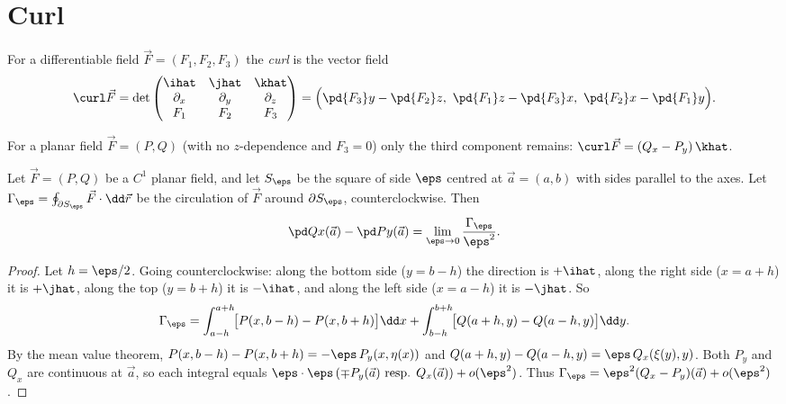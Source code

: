 \section{Curl}

\begin{definition}[Curl]
For a differentiable field $\vec F=(F_1,F_2,F_3)$ the \emph{curl} is the vector field
\[
\curl\vec F=\det\begin{pmatrix}\ihat&\jhat&\khat\\\partial_x&\partial_y&\partial_z\\F_1&F_2&F_3\end{pmatrix}
=\Bigl(\pd{F_3}y-\pd{F_2}z,\ \pd{F_1}z-\pd{F_3}x,\ \pd{F_2}x-\pd{F_1}y\Bigr).
\]
\end{definition}

For a planar field $\vec F=(P,Q)$ (with no $z$-dependence and $F_3=0$) only the third component remains: $\curl\vec F=(Q_x-P_y)\,\khat$.

\begin{theorem}[Curl = circulation per unit area]\label{thm:curlmeaning}
Let $\vec F=(P,Q)$ be a $C^1$ planar field, and let $S_\eps$ be the square of side $\eps$ centred at $\vec a=(a,b)$ with sides parallel to the axes. Let $\Gamma_\eps=\oint_{\partial S_\eps}\vec F\cdot\dd\vec r$ be the circulation of $\vec F$ around $\partial S_\eps$, counterclockwise. Then
\[
\pd Qx(\vec a)-\pd Py(\vec a)=\lim_{\eps\to0}\frac{\Gamma_\eps}{\eps^2}.
\]
\end{theorem}

\begin{proof}
Let $h=\eps/2$. Going counterclockwise: along the bottom side ($y=b-h$) the direction is $+\ihat$, along the right side ($x=a+h$) it is $+\jhat$, along the top ($y=b+h$) it is $-\ihat$, and along the left side ($x=a-h$) it is $-\jhat$. So
\[
\Gamma_\eps=\int_{a-h}^{a+h}\!\bigl[P(x,b-h)-P(x,b+h)\bigr]\dd x+\int_{b-h}^{b+h}\!\bigl[Q(a+h,y)-Q(a-h,y)\bigr]\dd y .
\]
By the mean value theorem, $P(x,b-h)-P(x,b+h)=-\eps\,P_y(x,\eta(x))$ and $Q(a+h,y)-Q(a-h,y)=\eps\,Q_x(\xi(y),y)$. Both $P_y$ and $Q_x$ are continuous at $\vec a$, so each integral equals $\eps\cdot\eps\,(\mp P_y(\vec a)\text{ resp. }Q_x(\vec a))+o(\eps^2)$. Thus $\Gamma_\eps=\eps^2(Q_x-P_y)(\vec a)+o(\eps^2)$.
\end{proof}

